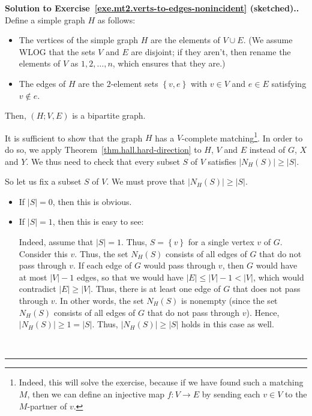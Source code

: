 \documentclass[numbers=enddot,12pt,final,onecolumn,notitlepage]{scrartcl}%
\newcounter{exer}
\theoremstyle{definition}
\newenvironment{proof}[1][Proof]{\noindent\textbf{#1.} }{\ \rule{0.5em}{0.5em}}
\newcommand{\set}[1]{\left\{ #1 \right\}}
\newcommand{\abs}[1]{\left| #1 \right|}
\newcommand{\tup}[1]{\left( #1 \right)}
\begin{document}
\begin{proof}[Solution to
Exercise~\ref{exe.mt2.verts-to-edges-nonincident} (sketched).]
Define a simple graph $H$ as follows:
\begin{itemize}
\item The vertices of the simple graph $H$ are the elements of
      $V \cup E$.
      (We assume WLOG that the sets $V$ and $E$ are disjoint; if they
      aren't, then rename the elements of $V$ as $1, 2, \ldots, n$,
      which ensures that they are.)
\item The edges of $H$ are the $2$-element sets
      $\set{v, e}$ with $v \in V$ and $e \in E$ satisfying
      $v \notin e$.
\end{itemize}
Then, $\tup{H; V, E}$ is a bipartite graph.

It is sufficient to show that the graph $H$ has a $V$-complete
matching\footnote{Indeed, this will solve the exercise, because if
we have found such a matching $M$, then we can define an injective map
$f : V \to E$ by sending each $v \in V$ to the $M$-partner of $v$.}.
In order to do so, we apply Theorem~\ref{thm.hall.hard-direction} to
$H$, $V$ and $E$ instead of $G$, $X$ and $Y$.
We thus need to check that every subset $S$ of $V$ satisfies
$\abs{N_H\tup{S}} \geq \abs{S}$.

So let us fix a subset $S$ of $V$.
We must prove that $\abs{N_H\tup{S}} \geq \abs{S}$.

\begin{itemize}

\item If $\abs{S} = 0$, then this is obvious.

\item If $\abs{S} = 1$, then this is easy to see: \par
      Indeed, assume that $\abs{S} = 1$.
      Thus, $S = \set{v}$ for a single vertex $v$ of $G$.
      Consider this $v$.
      Thus, the set $N_H \tup{S}$ consists of all edges of $G$ that
      do not pass through $v$.
      If each edge of $G$ would pass through $v$, then $G$ would have
      at most $\abs{V} - 1$ edges, so that we would have
      $\abs{E} \leq \abs{V} - 1 < \abs{V}$, which would contradict
      $\abs{E} \geq \abs{V}$.
      Thus, there is at least one edge of $G$ that does not pass
      through $v$.
      In other words, the set $N_H \tup{S}$ is nonempty (since
      the set $N_H \tup{S}$ consists of all edges of $G$ that
      do not pass through $v$).
      Hence, $\abs{N_H \tup{S}} \geq 1 = \abs{S}$.
      Thus, $\abs{N_H\tup{S}} \geq \abs{S}$ holds in this case as
      well.


\end{itemize}
\end{proof}
\end{document}
